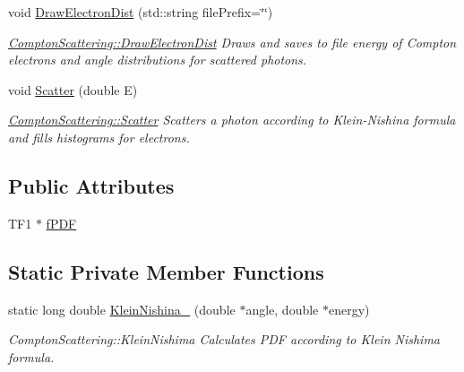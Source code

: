 \begin{DoxyCompactItemize}
void \hyperlink{classComptonScattering_ae04a6b8cc58e6b9c5455e0a38d42330d}{Draw\+Electron\+Dist} (std\+::string file\+Prefix=\char`\"{}\char`\"{})
\begin{DoxyCompactList}\small\item\em \hyperlink{classComptonScattering_ae04a6b8cc58e6b9c5455e0a38d42330d}{Compton\+Scattering\+::\+Draw\+Electron\+Dist} Draws and saves to file energy of Compton electrons and angle distributions for scattered photons. \end{DoxyCompactList}\item 
void \hyperlink{classComptonScattering_ada62d267585a2e3772d01b064e875756}{Scatter} (double E)
\begin{DoxyCompactList}\small\item\em \hyperlink{classComptonScattering_ada62d267585a2e3772d01b064e875756}{Compton\+Scattering\+::\+Scatter} Scatters a photon according to Klein-\/\+Nishina formula and fills histograms for electrons. \end{DoxyCompactList}\end{DoxyCompactItemize}
\subsection*{Public Attributes}
\begin{DoxyCompactItemize}
\item 
T\+F1 $\ast$ \hyperlink{classComptonScattering_add23479fa60d3dab59f9baa2d2dcf76f}{f\+P\+DF}
\end{DoxyCompactItemize}
\subsection*{Static Private Member Functions}
\begin{DoxyCompactItemize}
\item 
static long double \hyperlink{classComptonScattering_a0723eb40298a7697e6f3cbdb241eb19e}{Klein\+Nishina\+\_\+} (double $\ast$angle, double $\ast$energy)
\begin{DoxyCompactList}\small\item\em Compton\+Scattering\+::\+Klein\+Nishima Calculates P\+DF according to Klein Nishima formula. \end{DoxyCompactList}\end{DoxyCompactItemize}
